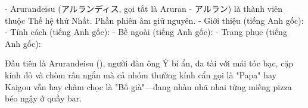 \documentclass[../main.tex]{subfiles}
\begin{document}


- Arurandeisu (アルランディス, gọi tắt là Aruran - アルラン) là thành viên thuộc Thế hệ thứ Nhất. Phần phiên âm \ruby giữ nguyên.
- Giới thiệu (tiếng Anh gốc):
- Tính cách (tiếng Anh gốc):
- Bề ngoài (tiếng Anh gốc):
- Trang phục (tiếng Anh gốc): 

Đầu tiên là Arurandeisu (), người đàn ông Ý bí ẩn, đa tài với mái tóc bạc, cặp kính đỏ và chòm râu ngắn mà cả nhóm thường kính cẩn gọi là "Papa" hay Kaigou vẫn hay châm chọc là "Bố già"—đang nhàn nhã nhai từng miếng pizza béo ngậy ở quầy bar.


\omk
\end{document}
